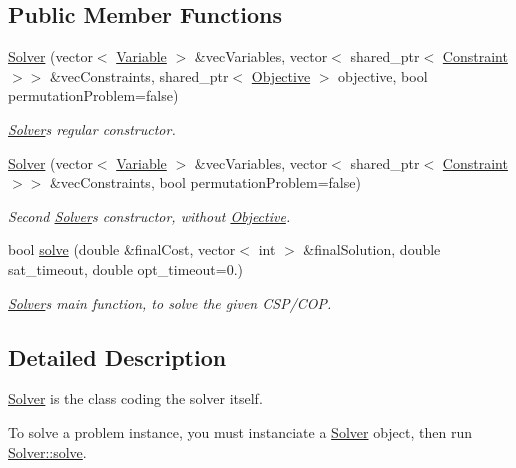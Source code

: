 \subsection*{Public Member Functions}
\begin{DoxyCompactItemize}
\item 
\hyperlink{classghost_1_1Solver_a08cd6511d8f11a1b78a6e46c9f02ec8a}{Solver} (vector$<$ \hyperlink{classghost_1_1Variable}{Variable} $>$ \&vec\+Variables, vector$<$ shared\+\_\+ptr$<$ \hyperlink{classghost_1_1Constraint}{Constraint} $>$$>$ \&vec\+Constraints, shared\+\_\+ptr$<$ \hyperlink{classghost_1_1Objective}{Objective} $>$ objective, bool permutation\+Problem=false)
\begin{DoxyCompactList}\small\item\em \hyperlink{classghost_1_1Solver}{Solver}\textquotesingle{}s regular constructor. \end{DoxyCompactList}\item 
\hyperlink{classghost_1_1Solver_a8fef29b475575713d7c507569e25976c}{Solver} (vector$<$ \hyperlink{classghost_1_1Variable}{Variable} $>$ \&vec\+Variables, vector$<$ shared\+\_\+ptr$<$ \hyperlink{classghost_1_1Constraint}{Constraint} $>$$>$ \&vec\+Constraints, bool permutation\+Problem=false)
\begin{DoxyCompactList}\small\item\em Second \hyperlink{classghost_1_1Solver}{Solver}\textquotesingle{}s constructor, without \hyperlink{classghost_1_1Objective}{Objective}. \end{DoxyCompactList}\item 
bool \hyperlink{classghost_1_1Solver_acc72c5a651e888858c10dfe300d96fa8}{solve} (double \&final\+Cost, vector$<$ int $>$ \&final\+Solution, double sat\+\_\+timeout, double opt\+\_\+timeout=0.)
\begin{DoxyCompactList}\small\item\em \hyperlink{classghost_1_1Solver}{Solver}\textquotesingle{}s main function, to solve the given C\+S\+P/\+C\+OP. \end{DoxyCompactList}\end{DoxyCompactItemize}


\subsection{Detailed Description}
\hyperlink{classghost_1_1Solver}{Solver} is the class coding the solver itself. 

To solve a problem instance, you must instanciate a \hyperlink{classghost_1_1Solver}{Solver} object, then run \hyperlink{classghost_1_1Solver_acc72c5a651e888858c10dfe300d96fa8}{Solver\+::solve}.


